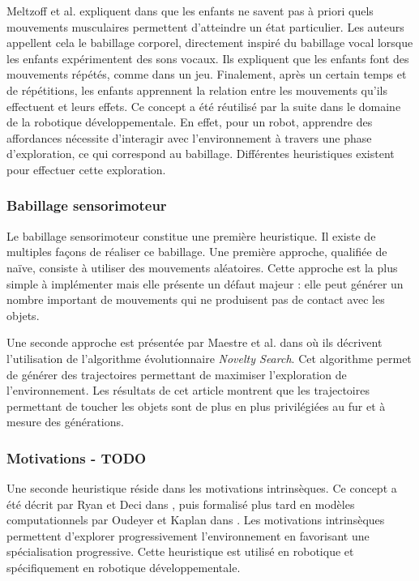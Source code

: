 \documentclass{llncs}
\begin{document}
Meltzoff et al. expliquent dans \cite{EDP:EDP157} que les enfants ne savent pas à priori quels mouvements musculaires permettent d'atteindre un état particulier.
Les auteurs appellent cela le babillage corporel, directement inspiré du babillage vocal lorsque les enfants expérimentent des sons vocaux.
Ils expliquent que les enfants font des mouvements répétés, comme dans un jeu.
Finalement, après un certain temps et de répétitions, les enfants apprennent la relation entre les mouvements qu'ils effectuent et leurs effets.
Ce concept a été réutilisé par la suite dans le domaine de la robotique développementale.
En effet, pour un robot, apprendre des affordances nécessite d'interagir avec l'environnement à travers une phase d'exploration, ce qui correspond au babillage. Différentes heuristiques existent pour effectuer cette exploration.



\subsubsection{Babillage sensorimoteur}

Le babillage sensorimoteur constitue une première heuristique.
Il existe de multiples façons de réaliser ce babillage.
Une première approche, qualifiée de naïve, consiste à utiliser des mouvements aléatoires.
Cette approche est la plus simple à implémenter mais elle présente un défaut majeur : elle peut générer un nombre important de mouvements qui ne produisent pas de contact avec les objets.

Une seconde approche est présentée par Maestre et al. dans \cite{Maestre2015} où ils décrivent l'utilisation de l'algorithme évolutionnaire \textit{Novelty Search}.
Cet algorithme permet de générer des trajectoires permettant de maximiser l'exploration de l'environnement.
Les résultats de cet article montrent que les trajectoires permettant de toucher les objets sont de plus en plus privilégiées au fur et à mesure des générations.




\subsubsection{Motivations - TODO}

Une seconde heuristique réside dans les motivations intrinsèques.
Ce concept a été décrit par Ryan et Deci dans \cite{Ryan2000}, puis formalisé plus tard en modèles computationnels par Oudeyer et Kaplan dans \cite{10.3389/neuro.12.006.2007}.
Les motivations intrinsèques permettent d'explorer progressivement l'environnement en favorisant une spécialisation progressive.
Cette heuristique est utilisé en robotique et spécifiquement en robotique développementale.
\end{document}
